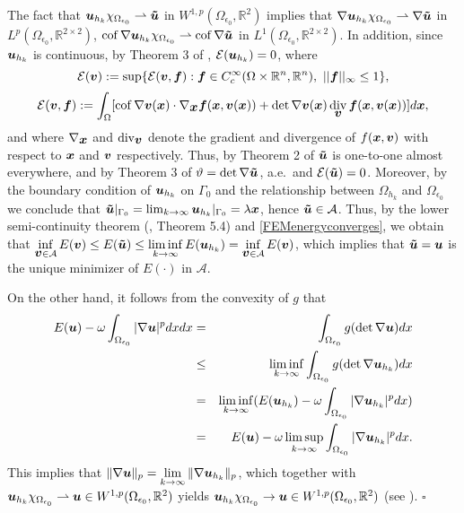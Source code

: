 \documentclass[12pt]{article}
\renewcommand{\vec}[1]{\mbox{\boldmath$#1$}}
\DeclareMathOperator{\sdiv}{div}
\DeclareMathOperator{\cof}{cof}
\numberwithin{equation}{section}
\begin{document}
The fact that $\vec{u}_{h_k} \chi_{\Omega_{\epsilon_0}}\rightharpoonup \vec{\tilde{u}}$
in $W^{1,p}(\Omega_{\epsilon_0},\mathbb{R}^2)$ implies that $\nabla \vec{u}_{h_k}
\chi_{\Omega_{\epsilon_0}} \rightharpoonup \nabla \vec{\tilde{u}}$ in
$L^p(\Omega_{\epsilon_0}, \mathbb{R}^{2\times 2})$, $\cof \nabla \vec{u}_{h_k}
\chi_{\Omega_{\epsilon_0}} \rightharpoonup \cof \nabla \vec{\tilde{u}}$ in
$L^1(\Omega_{\epsilon_0}, \mathbb{R}^{2\times 2})$. In addition,
since $\vec{u}_{h_k}$ is continuous, by Theorem 3 of \cite{Henao2011},
$\mathcal{E}(\vec{u}_{h_k})=0$, where
$$
\mathcal{E}(\vec{v}):=\sup \{ \mathcal{E}(\vec{v},\vec{f}):\vec{f} \in
C_c^{\infty}(\Omega \times \mathbb{R}^n,\mathbb{R}^n), ~||\vec{f}||_{\infty} \le 1\},
$$
$$
\mathcal{E}(\vec{v},\vec{f}):=\int_\Omega [\cof \nabla \vec{v}
(\vec{x}) \cdot \nabla_{\vec{x}} \vec{f}(\vec{x},\vec{v}(\vec{x}))+
\det \nabla \vec{v}(\vec{x}) \sdiv_{\vec{v}} \vec{f}(\vec{x},\vec{v}(\vec{x}))]d\vec{x},
$$
and where $\nabla_{\vec{x}}$ and $\sdiv_{\vec{v}}$ denote the gradient and divergence
of $f(\vec{x},\vec{v})$ with respect to $\vec{x}$ and $\vec{v}$ respectively.
Thus, by Theorem 2 of \cite{Henao2010} $\vec{\tilde{u}}$ is one-to-one almost everywhere,
and by Theorem 3 of \cite{Henao2010} $\vartheta =\det \nabla \vec{\tilde{u}}$, a.e.~and
$\mathcal{E}(\vec{\tilde{u}})=0$. Moreover,
by the boundary condition of $\vec{u}_{h_k}$ on $\Gamma_0$ and the relationship between
$\Omega_{h_k}$ and $\Omega_{\epsilon_0}$ we conclude that
$\vec{\tilde{u}}|_{\Gamma_0}=\lim_{k \rightarrow \infty}\vec{u}_{h_k}|_{\Gamma_0}=
\lambda \vec{x}$,
hence $\vec{\tilde{u}} \in \mathcal {A}$.
Thus, by the lower semi-continuity theorem (\cite{Ball81}, Theorem 5.4) and
\eqref{FEMenergyconverges}, we obtain that $\inf\limits_{\vec{v}\in \mathcal{A}} E(\vec{v}) \le
E(\vec{\tilde{u}})\le \liminf\limits_{k \rightarrow \infty}E(\vec{u}_{h_k})=
\inf\limits_{\vec{v}\in \mathcal{A}} E(\vec{v})$, which implies that $\vec{\tilde{u}}=\vec{u}$
is the unique minimizer of $E(\cdot)$ in $\mathcal{A}$.

On the other hand, it follows from the convexity of $g$ that
\begin{eqnarray*}
E(\vec{u})-\omega\int_{\Omega_{\epsilon_0}}|\nabla \vec{u}|^p dx
dx&=&\int_{\Omega_{\epsilon_0}}g(\det \nabla \vec{u})dx\\ &\le&\liminf_{k
\rightarrow \infty}\int_{\Omega_{\epsilon_0}}g(\det \nabla \vec{u}_{h_k})dx\\
&=&\liminf_{k \rightarrow \infty}(E(\vec{u}_{h_k})-\omega\int_{\Omega_{\epsilon_0}}|\nabla
\vec{u}_{h_k}|^pdx)\\
&=&E(\vec{u})-\omega\limsup_{k \rightarrow \infty}\int_{\Omega_{\epsilon_0}}|\nabla
\vec{u}_{h_k}|^pdx.
\end{eqnarray*}
This implies that $\|\nabla \vec{u}\|_p=\lim\limits_{k \rightarrow \infty}
\|\nabla \vec{u}_{h_k}\|_p$, which
together with $\vec{u}_{h_k} \chi_{\Omega_{\epsilon_0}}\rightharpoonup \vec{u}\in
W^{1,p}(\Omega_{\epsilon_0},\mathbb{R}^2)$ yields $\vec{u}_{h_k}\chi_{\Omega_{\epsilon_0}}
\rightarrow \vec{u} \in W^{1,p}(\Omega_{\epsilon_0},\mathbb{R}^2)$ (see \cite{Evans}).
\hfill $\square$
\end{document}
